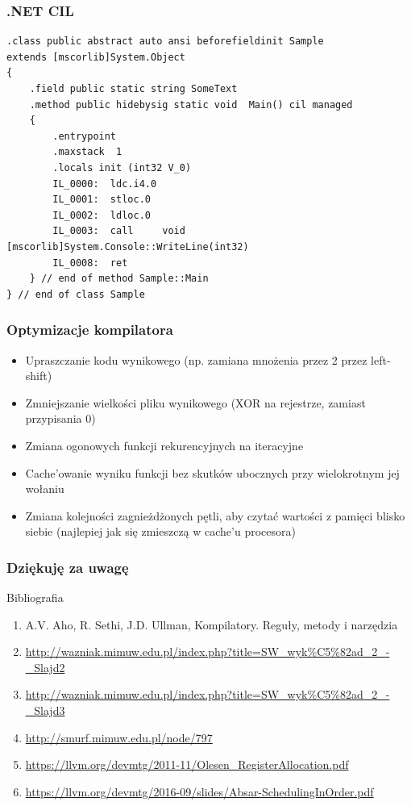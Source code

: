 \documentclass{beamer}
\begin{document}
	\begin{frame}[fragile]
		\frametitle{.NET CIL}
		\begin{lstlisting}[language=CIL]
.class public abstract auto ansi beforefieldinit Sample
extends [mscorlib]System.Object
{
	.field public static string SomeText
	.method public hidebysig static void  Main() cil managed
	{
		.entrypoint
		.maxstack  1
		.locals init (int32 V_0)
		IL_0000:  ldc.i4.0
		IL_0001:  stloc.0
		IL_0002:  ldloc.0
		IL_0003:  call     void [mscorlib]System.Console::WriteLine(int32)
		IL_0008:  ret
	} // end of method Sample::Main
} // end of class Sample
		\end{lstlisting}
	\end{frame}

	\begin{frame}
		\frametitle{Optymizacje kompilatora}
		\begin{itemize}
			\item Upraszczanie kodu wynikowego (np. zamiana mnożenia przez 2 przez left-shift)
			\item Zmniejszanie wielkości pliku wynikowego (XOR na rejestrze, zamiast przypisania 0)
			\item Zmiana ogonowych funkcji rekurencyjnych na iteracyjne
			\item Cache'owanie wyniku funkcji bez skutków ubocznych przy wielokrotnym jej wołaniu
			\item Zmiana kolejności zagnieżdżonych pętli, aby czytać wartości z pamięci blisko siebie (najlepiej jak się zmieszczą w cache'u procesora)
		\end{itemize}
	\end{frame}

	\begin{frame}
	 \frametitle{Dziękuję za uwagę}
	 Bibliografia
	 \begin{enumerate}
		\item A.V. Aho, R. Sethi, J.D. Ullman, Kompilatory. Reguły, metody i narzędzia
		\item \url{http://wazniak.mimuw.edu.pl/index.php?title=SW_wyk\%C5\%82ad_2_-_Slajd2}
		\item \url{http://wazniak.mimuw.edu.pl/index.php?title=SW_wyk\%C5\%82ad_2_-_Slajd3}
		\item \url{http://smurf.mimuw.edu.pl/node/797}
		\item \url{https://llvm.org/devmtg/2011-11/Olesen_RegisterAllocation.pdf}
		\item \url{https://llvm.org/devmtg/2016-09/slides/Absar-SchedulingInOrder.pdf}
	 \end{enumerate}
	\end{frame}
\end{document}

